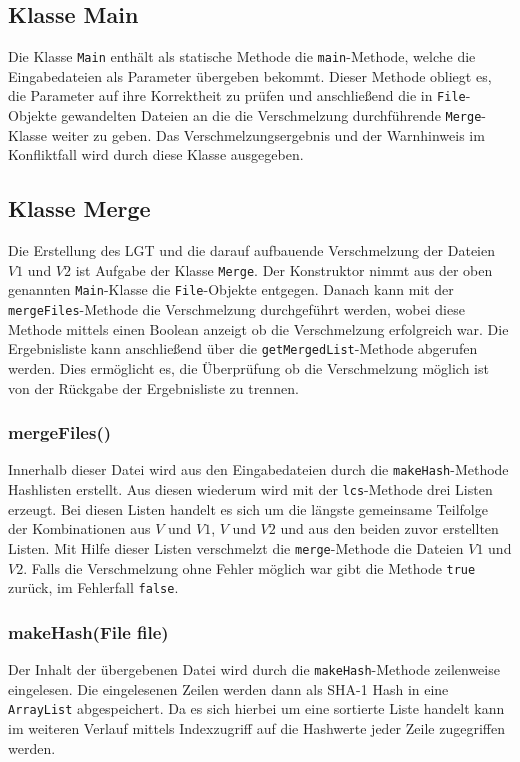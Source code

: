 \documentclass[a4paper,titlepage,12pt]{scrartcl}
\begin{document}
\subsection{Klasse Main}
\label{sec:classmain}
Die Klasse \texttt{Main} enthält als statische Methode die \texttt{main}-Methode, welche die Eingabedateien als Parameter übergeben bekommt.
Dieser Methode obliegt es, die Parameter auf ihre Korrektheit zu prüfen und anschließend die in \texttt{File}-Objekte gewandelten Dateien
an die die Verschmelzung durchführende \texttt{Merge}-Klasse weiter zu geben.
Das Verschmelzungsergebnis und der Warnhinweis im Konfliktfall wird durch diese Klasse ausgegeben.

\subsection{Klasse Merge}
\label{sec:classmerge}
Die Erstellung des LGT und die darauf aufbauende Verschmelzung der Dateien $V1$ und $V2$ ist Aufgabe der Klasse \texttt{Merge}. Der Konstruktor nimmt aus der oben genannten \texttt{Main}-Klasse die \texttt{File}-Objekte entgegen. Danach kann mit der \texttt{mergeFiles}-Methode die Verschmelzung durchgeführt werden, wobei diese Methode mittels einen Boolean anzeigt ob die Verschmelzung erfolgreich war. Die Ergebnisliste kann anschließend über die \texttt{getMergedList}-Methode abgerufen werden. Dies ermöglicht es, die Überprüfung ob die Verschmelzung möglich ist von der Rückgabe der Ergebnisliste zu trennen.

\subsubsection{mergeFiles()}
\label{sec:mergefiles}
Innerhalb dieser Datei wird aus den Eingabedateien durch die \texttt{makeHash}-Methode Hashlisten erstellt. Aus diesen wiederum wird mit der \texttt{lcs}-Methode drei Listen erzeugt.
Bei diesen Listen handelt es sich um die längste gemeinsame Teilfolge der Kombinationen aus $V$ und $V1$, $V$ und $V2$ und aus den beiden zuvor erstellten Listen. Mit Hilfe dieser Listen verschmelzt die \texttt{merge}-Methode die Dateien $V1$ und $V2$. Falls die Verschmelzung ohne Fehler möglich war gibt die Methode \texttt{true} zurück, im Fehlerfall \texttt{false}.

\subsubsection{makeHash(File file)}
\label{sec:makehash}
Der Inhalt der übergebenen Datei wird durch die \texttt{makeHash}-Methode zeilenweise eingelesen.
Die eingelesenen Zeilen werden dann als SHA-1 Hash in eine \texttt{ArrayList} abgespeichert. Da es sich hierbei um eine sortierte Liste handelt kann im weiteren Verlauf mittels Indexzugriff auf die Hashwerte jeder Zeile zugegriffen werden.
\end{document}
